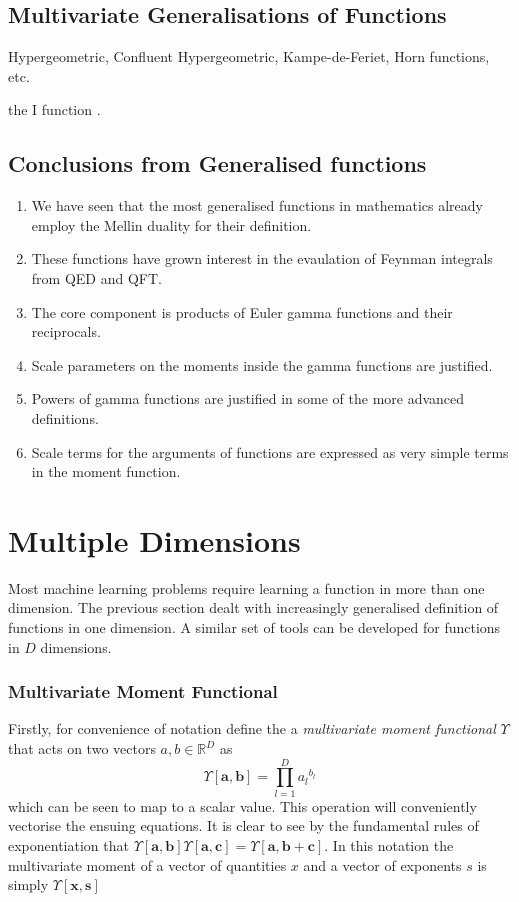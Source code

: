 \documentclass[journal=jcisd8,manuscript=article,layout=onecolumn,pdftex,floatfix,amsmath,amssymb,10pt]{achemso}
\begin{document}
\subsection{Multivariate Generalisations of Functions}
Hypergeometric, 
Confluent Hypergeometric,
Kampe-de-Feriet, Horn functions, etc.



the I function \cite{}.


\subsection{Conclusions from Generalised functions}
\begin{enumerate}
\item We have seen that the most generalised functions in mathematics already employ the Mellin duality for their definition.
\item These functions have grown interest in the evaulation of Feynman integrals from QED and QFT.
\item The core component is products of Euler gamma functions and their reciprocals.
\item Scale parameters on the moments inside the gamma functions are justified.
\item Powers of gamma functions are justified in some of the more advanced definitions.
\item Scale terms for the arguments of functions are expressed as very simple terms in the moment function.
\end{enumerate}


\section{Multiple Dimensions}
Most machine learning problems require learning a function in more than one dimension. The previous section dealt with increasingly generalised definition of functions in one dimension. A similar set of tools can be developed for functions in $D$ dimensions. 

\subsubsection{Multivariate Moment Functional}
Firstly, for convenience of notation define the a \emph{multivariate moment functional} $\Upsilon$ that acts on two vectors $a,b \in \mathbb{R}^D$ as
\begin{equation}
\Upsilon[\mathbf{a},\mathbf{b}] = \prod_{l=1}^D {a_l}^{b_l}
\end{equation}
which can be seen to map to a scalar value. This operation will conveniently vectorise the ensuing equations. It is clear to see by the fundamental rules of exponentiation that $\Upsilon[\mathbf{a},\mathbf{b}]\Upsilon[\mathbf{a},\mathbf{c}] = \Upsilon[\mathbf{a},\mathbf{b+c}]$.  In this notation the multivariate moment of a vector of quantities $x$ and a vector of exponents $s$ is simply $\Upsilon[\mathbf{x},\mathbf{s}]$
\end{document}
